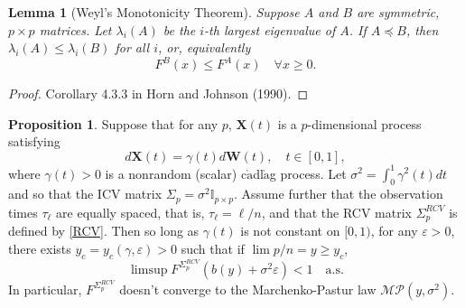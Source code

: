 \documentclass[a4paper,11pt]{article}
\theoremstyle{plain}
\newtheorem{lmm}[thm]{Lemma}
\theoremstyle{definition}
\newtheorem{prps}[thm]{Proposition}
\begin{document}
	\begin{lmm}[Weyl's Monotonicity Theorem]
		Suppose $A$ and $B$ are symmetric, $p \times p$ matrices. Let $\lambda_i(A)$ be the $i$-th largest eigenvalue of $A$. If $A \preceq B$, then $\lambda_i(A) \leq \lambda_i(B)$ for all $i$, or, equivalently
		\[ F^B(x) \leq F^A(x) \quad \forall x \geq 0. \]
    \end{lmm}
    \begin{proof}
    	Corollary 4.3.3 in Horn and Johnson (1990).
    \end{proof}
		
	\begin{prps} \label{counter RCV}
		Suppose that for any $p$, $\mathbf{X}(t)$ is a $p$-dimensional process satisfying
		\begin{equation}
		d \mathbf{X}(t) = \gamma(t) d\mathbf{W}(t), \quad t \in [0, 1],
		\end{equation}
		where $\gamma(t) > 0$ is a nonrandom (scalar) c$\grave{\text{a}}$dl$\grave{\text{a}}$g process. Let $\sigma^2 = \int_0^1 \gamma^2(t) dt$ and so that the ICV matrix $\Sigma_p = \sigma^2 \mathbb{I}_{p \times p}$. Assume further that the observation times $\tau_{\ell}$ are equally spaced, that is, $\tau_{\ell} = \ell / n$, and that the RCV matrix $\Sigma_p^{RCV}$ is defined by \eqref{RCV}. Then so long as $\gamma(t)$ is not constant on $[0, 1)$, for any $\varepsilon > 0$, there exists $y_c = y_c(\gamma, \varepsilon) > 0$ such that if $\lim p/n = y \geq y_c$,
		\begin{equation}
			\limsup F^{\Sigma_p^{RCV}}(b(y)+\sigma^2\varepsilon) < 1 \quad \text{a.s.}
		\end{equation}
		In particular, $F^{\Sigma_p^{RCV}}$ doesn't converge to the Marchenko-Pastur law $\mathcal{MP}(y, \sigma^2)$.
    \end{prps}
    
\end{document}
